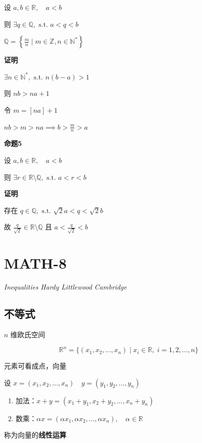 设 \(a, b\in \mathbb{R},\quad a < b\)

则 \(\exists q \in \mathbb{Q}, \text{ s.t. } a<q<b\)

\(\mathbb{Q} = \left\{  \frac{m}{n} \mid m\in \mathbb{Z}, n \in  \mathbb{N}^*  \right\}\)

\textbf{证明}

\(\exists n \in \mathbb{N}^*, \text{ s.t. } n(b-a)>1\)

则 \(nb>na+1\)

令 \(m=[na]+1\)

\(nb>m>na \implies b> \frac{m}{n} > a\)

\textbf{命题5}

设 \(a, b\in\mathbb{R},\quad a<b\)

则
\(\exists r \in \mathbb{R} \setminus \mathbb{Q}, \text{ s.t. } a<r<b\)

\textbf{证明}

存在 \(q\in\mathbb{Q}, \text{ s.t. } \sqrt{ 2 }a<q<\sqrt{ 2 }b\)

故 \(\frac{q}{\sqrt{ 2 }}\in\mathbb{R} \setminus \mathbb{Q}\) 且
\(a< \frac{q}{\sqrt{ 2 }}<b\)

\section{MATH-8}\label{math-8}

\emph{Inequalities Hardy Littlewood Cambridge}

\subsection{不等式}\label{ux4e0dux7b49ux5f0f}

\(n\) 维欧氏空间

\[
\mathbb{R}^n=\{ (x_{1},x_{2},\dots, x_{n}) \mid x_{i}\in \mathbb{R},\; i=1,2,\dots ,n\}
\]

元素可看成点，向量

设 \(x=(x_{1},x_{2},\dots ,x_{n})\quad y=(y_{1},y_{2},\dots,y_{n})\)

\begin{enumerate}
\def\labelenumi{\arabic{enumi}.}
\tightlist
\item
  加法：\(x+y=(x_{1}+y_{1},x_{2}+y_{2},\dots,x_{n}+y_{n})\)
\item
  数乘：\(\alpha x=(\alpha x_{1}, \alpha x_{2}, \dots , \alpha x_{n}), \quad \alpha \in \mathbb{R}\)
\end{enumerate}

称为向量的\textbf{线性运算}

